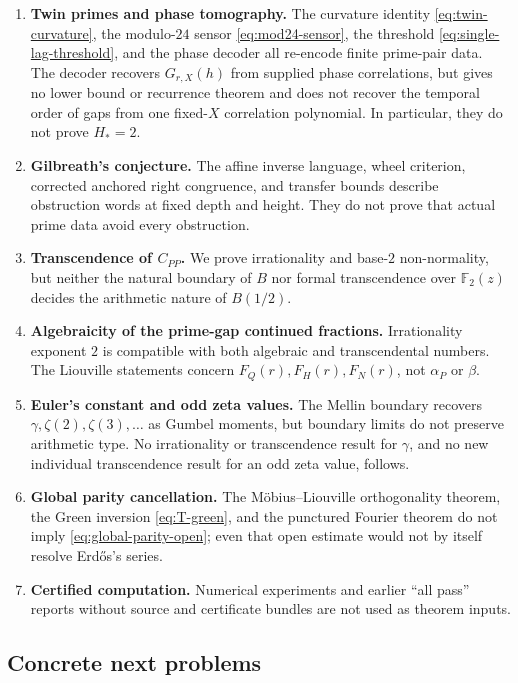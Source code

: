 \documentclass[11pt]{article}
\theoremstyle{definition}
\theoremstyle{remark}
\newcommand{\Ftwo}{\mathbb F_{2}}
\begin{document}
\begin{enumerate}
 \item \textbf{Twin primes and phase tomography.}  The curvature identity
 \eqref{eq:twin-curvature}, the modulo-$24$ sensor \eqref{eq:mod24-sensor}, the
 threshold \eqref{eq:single-lag-threshold}, and the phase decoder all re-encode finite
 prime-pair data.  The decoder recovers $G_{r,X}(h)$ from supplied phase correlations,
 but gives no lower bound or recurrence theorem and does not recover the temporal order
 of gaps from one fixed-$X$ correlation polynomial.  In particular, they do not prove
 $H_*=2$.
 \item \textbf{Gilbreath's conjecture.}  The affine inverse language, wheel criterion,
 corrected anchored right congruence, and transfer bounds describe obstruction words at
 fixed depth and height.  They do not prove that actual prime data avoid every obstruction.
 \item \textbf{Transcendence of $C_{PP}$.}  We prove irrationality and base-$2$
 non-normality, but neither the natural boundary of $B$ nor formal transcendence over
 $\Ftwo(z)$ decides the arithmetic nature of $B(1/2)$.
 \item \textbf{Algebraicity of the prime-gap continued fractions.}  Irrationality exponent
 $2$ is compatible with both algebraic and transcendental numbers.  The Liouville
 statements concern $F_Q(r),F_H(r),F_N(r)$, not $\alpha_P$ or $\beta$.
 \item \textbf{Euler's constant and odd zeta values.}  The Mellin boundary recovers
 $\gamma,\zeta(2),\zeta(3),\ldots$ as Gumbel moments, but boundary limits do not preserve
 arithmetic type.  No irrationality or transcendence result for $\gamma$, and no new
 individual transcendence result for an odd zeta value, follows.
 \item \textbf{Global parity cancellation.}  The M\"obius--Liouville orthogonality
 theorem, the Green inversion \eqref{eq:T-green}, and the punctured Fourier theorem do
 not imply \eqref{eq:global-parity-open}; even that open estimate would not by itself
 resolve Erd\H{o}s's series.
 \item \textbf{Certified computation.}  Numerical experiments and earlier ``all pass''
 reports without source and certificate bundles are not used as theorem inputs.
\end{enumerate}

\subsection{Concrete next problems}
\end{document}
